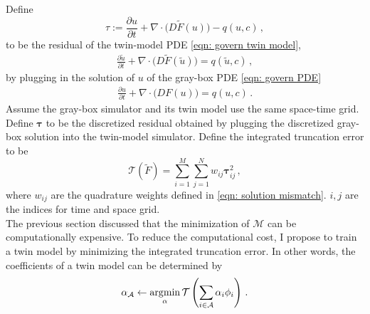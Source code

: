 

Define
\begin{equation}
    \tau := \frac{\partial u}{\partial t} 
    + \nabla \cdot \big(D \tilde{F}(u)\big) - q(u,c)\,,
    \label{eqn: residual}
\end{equation}
to be the residual of the twin-model PDE \eqref{eqn: govern twin model},
\begin{equation*}\begin{split}
    \frac{\partial \tilde{u}}{\partial t}+ \nabla \cdot \big(D \tilde{F}(\tilde{u})\big) = q(\tilde{u},c)\,,
\end{split}
\end{equation*}
by plugging in the
solution of $u$ of the gray-box PDE \eqref{eqn: govern PDE}
\begin{equation*}\begin{split}
    \frac{\partial u}{\partial t}+ \nabla \cdot \big( D F(u) \big) = q(u,c)\,.
\end{split}
\end{equation*}
Assume the gray-box simulator and its twin model use the same space-time grid. 
Define $\boldsymbol{\tau}$ to be the discretized residual obtained by plugging the discretized 
gray-box solution into the twin-model simulator.
Define the integrated truncation error to be
\begin{equation}
    \mathcal{T}(\tilde{F}) = \sum_{i=1}^M \sum_{j=1}^N w_{ij} \boldsymbol{\tau}_{ij}^2 \,,
    \label{eqn: truncation error}
\end{equation}
where $w_{ij}$ are the quadrature weights defined in \eqref{eqn: solution mismatch}. 
$i,j$ are the indices for time and space grid.\\

The previous section discussed that the minimization of $\mathcal{M}$ can be computationally expensive.
To reduce the computational cost, I propose to train a twin model 
by minimizing the integrated truncation error.
In other words, the coefficients of a twin model can be determined by
\begin{equation}
    \alpha_{\mathcal{A}} \leftarrow \operatorname*{\arg\!\min}_{\alpha} \mathcal{T}\left(\sum_{i \in \mathcal{A}}
    \alpha_i \phi_i\right)\,.
    \label{eqn: minimize truncation error}
\end{equation}

